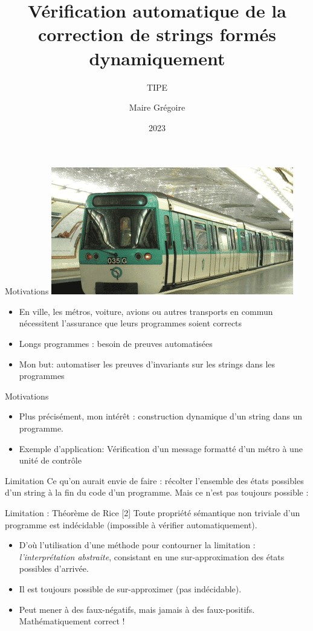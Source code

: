\documentclass{beamer}
\title[Correction automatique de strings]{Vérification automatique de la correction de strings formés dynamiquement}
\subtitle{TIPE}
\author{Maire Grégoire}
\date{2023}
\begin{document}
\frame{\titlepage}

\begin{frame}{Motivations}
  \includegraphics{ img_metro }
  \begin{itemize}
    \item En ville, les métros, voiture, avions ou autres transports en commun
      nécessitent l'assurance que leurs programmes soient corrects
    \item Longs programmes : besoin de preuves automatisées
    \item Mon but: automatiser les preuves d'invariants sur les strings dans les programmes
  \end{itemize}
\end{frame}

\begin{frame}{Motivations}
  \begin{itemize}
    \item Plus précisément, mon intérêt : construction dynamique d'un string dans un programme.
    \item Exemple d'application: Vérification d'un message formatté d'un métro à une unité de contrôle
  \end{itemize}
\end{frame}

\begin{frame}{Limitation}
  Ce qu'on aurait envie de faire : récolter l'ensemble des états possibles d'un string
  à la fin du code d'un programme. Mais ce n'est pas toujours possible :
  \begin{alertblock}{Limitation : Théorème de Rice [2]}
  Toute propriété sémantique non triviale d'un programme est indécidable (impossible à vérifier automatiquement).
  \end{alertblock}
  \begin{itemize}
    \item D'où l'utilisation d'une méthode pour contourner la limitation :
      \emph{l'interprétation abstraite}, consistant en une sur-approximation des états possibles d'arrivée.
    \item Il est toujours possible de sur-approximer (pas indécidable).
    \item Peut mener à des faux-négatifs, mais jamais à des faux-positifs. Mathématiquement correct !
  \end{itemize}
\end{frame}
\end{document}
